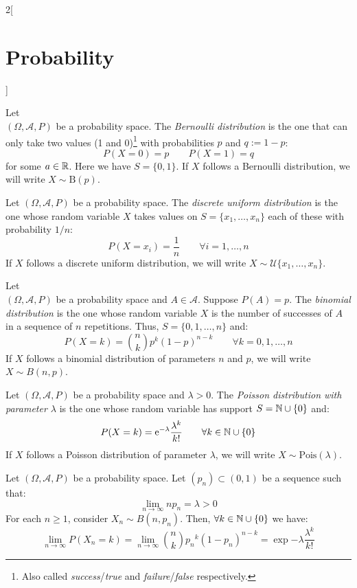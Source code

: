 \documentclass[../../../main.tex]{subfiles}
\begin{document}
\begin{multicols}{2}[\section{Probability}]
\begin{definition}
  \end{definition}
  \begin{definition}
    Let\\ $(\Omega,\mathcal{A},P)$ be a probability space. The \textit{Bernoulli distribution} is the one that can only take two values (1 and 0)\footnote{Also called \textit{success}/\textit{true} and \textit{failure}/\textit{false} respectively.} with probabilities $p$ and $q:=1-p$: $$P(X=0)=p\qquad P(X=1)=q$$ for some $a\in\mathbb{R}$. Here we have $S=\{0,1\}$. If $X$ follows a Bernoulli distribution, we will write $X\sim \text{B}(p)$.
  \end{definition}
  \begin{definition}
    Let $(\Omega,\mathcal{A},P)$ be a probability space. The \textit{discrete uniform distribution} is the one whose random variable $X$ takes values on $S=\{x_1,\ldots,x_n\}$ each of these with probability $1/n$: $$P(X=x_i)=\frac{1}{n}\qquad \forall i=1,\ldots,n$$ If $X$ follows a discrete uniform distribution, we will write $X\sim \mathcal{U}\{x_1,\ldots,x_n\}$.
  \end{definition}
  \begin{definition}
    Let\\ $(\Omega,\mathcal{A},P)$ be a probability space and $A\in\mathcal{A}$. Suppose $P(A)=p$. The \textit{binomial distribution} is the one whose random variable $X$ is the number of successes of $A$ in a sequence of $n$ repetitions. Thus, $S=\{0,1,\ldots,n\}$ and: $$P(X=k)=\binom{n}{k}p^k{(1-p)}^{n-k}\qquad \forall k=0,1,\ldots,n$$ If $X$ follows a binomial distribution of parameters $n$ and $p$, we will write $X\sim B(n,p)$.
  \end{definition}
  \begin{definition}
    Let $(\Omega,\mathcal{A},P)$ be a probability space and $\lambda>0$. The \textit{Poisson distribution with parameter $\lambda$} is the one whose random variable has support $S=\mathbb{N}\cup\{0\}$ and: $$P(X=k)=\mathrm{e}^{-\lambda}\frac{\lambda^k}{k!}\qquad \forall k\in\mathbb{N}\cup\{0\}$$ If $X$ follows a Poisson distribution of parameter $\lambda$, we will write $X\sim \text{Pois}(\lambda)$.
  \end{definition}
  \begin{theorem}
    Let $(\Omega,\mathcal{A},P)$ be a probability space. Let $(p_n)\subset(0,1)$ be a sequence such that: $$\lim_{n\to\infty}np_n=\lambda>0$$
    For each $n\geq 1$, consider $X_n\sim B(n,p_n)$. Then, $\forall k\in\mathbb{N}\cup\{0\}$ we have: $$\lim_{n\to\infty}P(X_n=k)=\lim_{n\to\infty}\binom{n}{k}{p_n}^k{(1-p_n)}^{n-k}=\exp{-\lambda}\frac{\lambda^k}{k!}$$

\end{theorem}
\end{multicols}
\end{document}
